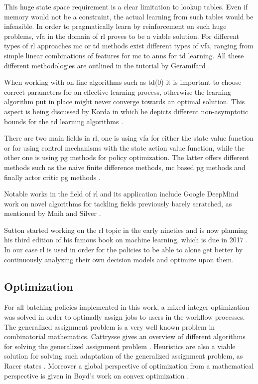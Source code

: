 \documentclass{seal_thesis}
\begin{document}
This huge state space requirement is a clear limitation to lookup tables. Even if memory would not be a constraint, the actual learning from such tables would be infeasible. In order to pragmatically learn by reinforcement on such huge problems, \gls{vfa} in the domain of \gls{rl} proves to be a viable solution. For different types of \gls{rl} approaches \ie \gls{mc} or \gls{td} methods exist different types of \gls{vfa}, ranging from simple linear combinations of features for \gls{mc} to \glspl{ann} for \gls{td} learning. All these different methodologies are outlined in the tutorial by Geramifard \cite{Geramifard2013}.

When working with on-line algorithms such as \gls{td}(0) it is important to choose correct parameters for an effective learning process, otherwise the learning algorithm put in place might never converge towards an optimal solution. This aspect is being discussed by Korda in which he depicts different non-asymptotic bounds for the \gls{td} learning algorithms \cite{Korda2014}.

There are two main fields in \gls{rl}, one is using \gls{vfa} for either the state value function or for using control mechanisms with the state action value function, while the other one is using \gls{pg} methods for policy optimization. The latter offers different methods such as the naive finite difference methods, \gls{mc} based \gls{pg} methods and finally actor critic \gls{pg} methods \cite{Silver2014}.

Notable works in the field of \gls{rl} and its application include Google DeepMind work on novel algorithms for tackling fields previously barely scratched, as mentioned by Mnih \etal and Silver \etal \cite{Mnih2015,Silver2016}.

Sutton started working on the \gls{rl} topic in the early nineties and is now planning his third edition of his famous book on machine learning, which is due in 2017 \cite{Sutton2017}. In our case \gls{rl} is used in order for the policies to be able to alone get better by continuously analyzing their own decision models and optimize upon them.

\subsection{Optimization}

For all batching policies implemented in this work, a mixed integer optimization was solved in order to optimally assign jobs to users in the workflow processes. The generalized assignment problem is a very well known problem in combinatorial mathematics. Cattrysse gives an overview of different algorithms for solving the generalized assignment problem \cite{Cattrysse1992}. Heuristics are also a viable solution for solving such adaptation of the generalized assignment problem, as Racer states \cite{Racer1994}. Moreover a global perspective of optimization from a mathematical perspective is given in Boyd's work on convex optimization \cite{Boyd2004}.
\end{document}
